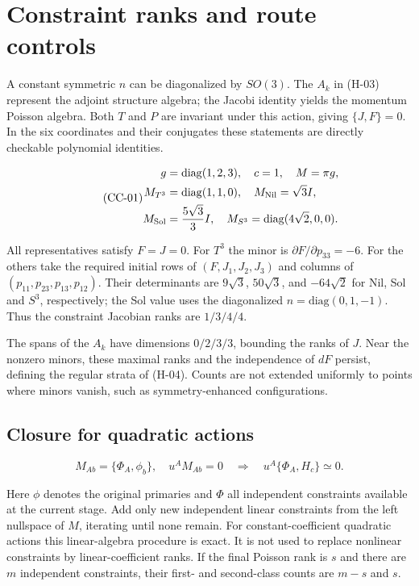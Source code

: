 \section{Constraint ranks and route controls}

A constant symmetric $n$ can be diagonalized by $SO(3)$. The $A_k$ in (H-03) represent the adjoint structure algebra; the Jacobi identity yields the momentum Poisson algebra. Both $T$ and $P$ are invariant under this action, giving $\{J,F\}=0$. In the six coordinates and their conjugates these statements are directly checkable polynomial identities.

\begin{equation}\tag{CC-01}\label{eq:CC-01}
\begin{aligned}g&=\mathrm{diag}(1,2,3),\quad c=1,\quad M=\pi g,\\ M_{T^3}&=\mathrm{diag}(1,1,0),\quad M_{\rm Nil}=\sqrt3 I,\\ M_{\rm Sol}&=\frac{5\sqrt3}{3}I,\quad M_{S^3}=\mathrm{diag}(4\sqrt2,0,0).\end{aligned}
\end{equation}

All representatives satisfy $F=J=0$. For $T^3$ the minor is $\partial F/\partial p_{33}=-6$. For the others take the required initial rows of $(F,J_1,J_2,J_3)$ and columns of $(p_{11},p_{23},p_{13},p_{12})$. Their determinants are $9\sqrt3$, $50\sqrt3$, and $-64\sqrt2$ for Nil, Sol and $S^3$, respectively; the Sol value uses the diagonalized $n=\mathrm{diag}(0,1,-1)$. Thus the constraint Jacobian ranks are $1/3/4/4$.

The spans of the $A_k$ have dimensions $0/2/3/3$, bounding the ranks of $J$. Near the nonzero minors, these maximal ranks and the independence of $dF$ persist, defining the regular strata of (H-04). Counts are not extended uniformly to points where minors vanish, such as symmetry-enhanced configurations.

\subsection{Closure for quadratic actions}

\begin{equation}\tag{CC-02}\label{eq:CC-02}
M_{A b}=\{\Phi_A,\phi_b\},\quad u^AM_{Ab}=0\quad\Longrightarrow\quad u^A\{\Phi_A,H_c\}\simeq0.
\end{equation}

Here $\phi$ denotes the original primaries and $\Phi$ all independent constraints available at the current stage. Add only new independent linear constraints from the left nullspace of $M$, iterating until none remain. For constant-coefficient quadratic actions this linear-algebra procedure is exact. It is not used to replace nonlinear constraints by linear-coefficient ranks. If the final Poisson rank is $s$ and there are $m$ independent constraints, their first- and second-class counts are $m-s$ and $s$.

